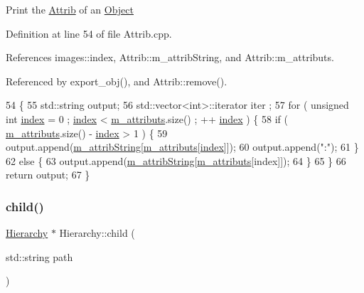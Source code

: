 Print the \hyperlink{classAttrib}{Attrib} of an \hyperlink{classObject}{Object} 

Definition at line 54 of file Attrib.\+cpp.



References images\+::index, Attrib\+::m\+\_\+attrib\+String, and Attrib\+::m\+\_\+attributs.



Referenced by export\+\_\+obj(), and Attrib\+::remove().


\begin{DoxyCode}
54                             \{
55   std::string output;
56   std::vector<int>::iterator iter ;
57   \textcolor{keywordflow}{for} ( \textcolor{keywordtype}{unsigned} \textcolor{keywordtype}{int} \hyperlink{namespaceimages_a54407fd574970b3178647ae096321a57}{index} = 0 ; \hyperlink{namespaceimages_a54407fd574970b3178647ae096321a57}{index} < \hyperlink{classAttrib_ac4bd58a0cc6b38a3b711d609a3d3aacc}{m\_attributs}.size() ; ++
      \hyperlink{namespaceimages_a54407fd574970b3178647ae096321a57}{index} ) \{
58     \textcolor{keywordflow}{if} ( \hyperlink{classAttrib_ac4bd58a0cc6b38a3b711d609a3d3aacc}{m\_attributs}.size() - \hyperlink{namespaceimages_a54407fd574970b3178647ae096321a57}{index} > 1 ) \{
59       output.append(\hyperlink{classAttrib_a3414521d7a82476e874b25a5407b5e63}{m\_attribString}[\hyperlink{classAttrib_ac4bd58a0cc6b38a3b711d609a3d3aacc}{m\_attributs}[\hyperlink{namespaceimages_a54407fd574970b3178647ae096321a57}{index}]]);
60       output.append(\textcolor{stringliteral}{":"});
61     \}
62     \textcolor{keywordflow}{else} \{
63       output.append(\hyperlink{classAttrib_a3414521d7a82476e874b25a5407b5e63}{m\_attribString}[\hyperlink{classAttrib_ac4bd58a0cc6b38a3b711d609a3d3aacc}{m\_attributs}[index]]);
64     \}
65   \}
66   \textcolor{keywordflow}{return} output;
67 \}
\end{DoxyCode}
\mbox{\label{classHierarchy_a1e207f973c694b538bf90107b4868817}} 
\subsubsection{\texorpdfstring{child()}{child()}}
{\footnotesize\ttfamily \hyperlink{classHierarchy}{Hierarchy} $\ast$ Hierarchy\+::child (\begin{DoxyParamCaption}\item[{std\+::string}]{path }\end{DoxyParamCaption})\hspace{0.3cm}{\ttfamily [inherited]}}



